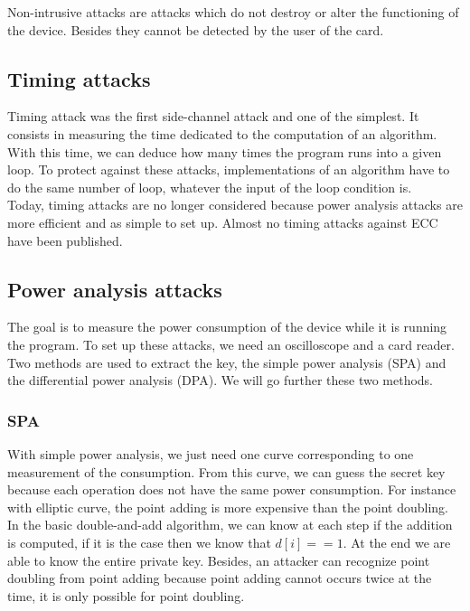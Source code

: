 \documentclass[journal]{IEEEtran}
\begin{document}
Non-intrusive attacks are attacks which do not destroy or alter the functioning of the device. Besides they cannot be detected by the user of the card. 
   
    \subsection{Timing attacks}

Timing attack was the first side-channel attack and one of the simplest. It consists in measuring the time dedicated to the computation of an algorithm. With this time, we can deduce how many times the program runs into a given loop.
To protect against these attacks, implementations of an algorithm have to do the same number of loop, whatever the input of the loop condition is. \\

Today, timing attacks are no longer considered because power analysis attacks are more efficient and as simple to set up. Almost no timing attacks against ECC have been published.

    \subsection{Power analysis attacks}

The goal is to measure the power consumption of the device while it is running the program. To set up these attacks, we need an oscilloscope and a card reader.
Two methods are used to extract the key, the simple power analysis (SPA) and the differential power analysis (DPA). We will go further these two methods.\\

        \subsubsection{SPA}
With simple power analysis, we just need one curve corresponding to one measurement of the consumption. From this curve, we can guess the secret key because each operation does not have the same power consumption. For instance with elliptic curve, the point adding is more expensive than the point doubling. In the basic double-and-add algorithm, we can know at each step if the addition is computed, if it is the case then we know that $ d[i]==1 $. At the end we are able to know the entire private key. Besides, an attacker can recognize point doubling from point adding because point adding cannot occurs twice at the time, it is only possible for point doubling.
\end{document}
